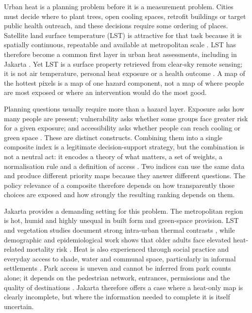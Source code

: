 \documentclass[times,twoside]{_Templates/MultiTargetManuscript}
\begin{document}
Urban heat is a planning problem before it is a measurement problem. Cities
must decide where to plant trees, open cooling spaces, retrofit buildings or
target public health outreach, and these decisions require some ordering of
places. Satellite land surface temperature (LST) is attractive for that task
because it is spatially continuous, repeatable and available at metropolitan
scale \citep{oke1982,voogt2003}. LST has therefore become a common first layer in
urban heat assessments, including in Jakarta \citep{siswanto2023,putra2021,rizki2024}.
Yet LST is a surface property retrieved from clear-sky remote sensing; it is not
air temperature, personal heat exposure or a health outcome
\citep{schwarz2012,voogt2003}. A map of the hottest pixels is a map of one
hazard component, not a map of where people are most exposed or where an
intervention would do the most good.

Planning questions usually require more than a hazard layer. Exposure asks how
many people are present; vulnerability asks whether some groups face greater
risk for a given exposure; and accessibility asks whether people can reach
cooling or green space \citep{reid2009,wolf2013,harlan2006}. These are distinct
constructs. Combining them into a single composite index is a legitimate
decision-support strategy, but the combination is not a neutral act: it encodes
a theory of what matters, a set of weights, a normalisation rule and a
definition of access \citep{malczewski2006,saisana2005,greco2019}. Two indices
can use the same data and produce different priority maps because they answer
different questions. The policy relevance of a composite therefore depends on
how transparently those choices are exposed and how strongly the resulting
ranking depends on them.

Jakarta provides a demanding setting for this problem. The metropolitan region
is hot, humid and highly unequal in built form and green-space provision. LST
and vegetation studies document strong intra-urban thermal contrasts
\citep{siswanto2023,putra2021,rizki2024}, while demographic and epidemiological
work shows that older adults face elevated heat-related mortality risk
\citep{varquez2020}. Heat is also experienced through social practice and
everyday access to shade, water and communal space, particularly in informal
settlements \citep{salsabila2023}. Park access is uneven and cannot be inferred
from park counts alone; it depends on the pedestrian network, entrances,
permissions and the quality of destinations \citep{wolch2014,rigolon2016,ekkel2017}.
Jakarta therefore offers a case where a heat-only map is clearly incomplete, but
where the information needed to complete it is itself uncertain.
\end{document}
